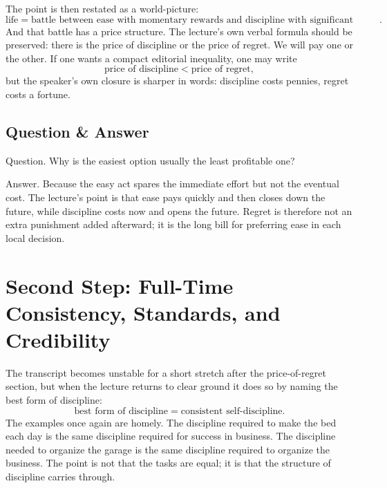 The point is then restated as a world-picture:
\begin{equation}
\text{life} = \text{battle between ease with momentary rewards and discipline with significant rewards}.
\end{equation}
And that battle has a price structure. The lecture's own verbal formula should be preserved: there is the price of discipline or the price of regret. We will pay one or the other. If one wants a compact editorial inequality, one may write
\begin{equation}
\text{price of discipline} < \text{price of regret},
\end{equation}
but the speaker's own closure is sharper in words: discipline costs pennies, regret costs a fortune.

\subsection{Question \& Answer}

Question. Why is the easiest option usually the least profitable one?

Answer. Because the easy act spares the immediate effort but not the eventual cost. The lecture's point is that ease pays quickly and then closes down the future, while discipline costs now and opens the future. Regret is therefore not an extra punishment added afterward; it is the long bill for preferring ease in each local decision.

\section{Second Step: Full-Time Consistency, Standards, and Credibility}

The transcript becomes unstable for a short stretch after the price-of-regret section, but when the lecture returns to clear ground it does so by naming the best form of discipline:
\begin{equation}
\text{best form of discipline} = \text{consistent self-discipline}.
\end{equation}
The examples once again are homely. The discipline required to make the bed each day is the same discipline required for success in business. The discipline needed to organize the garage is the same discipline required to organize the business. The point is not that the tasks are equal; it is that the structure of discipline carries through.

